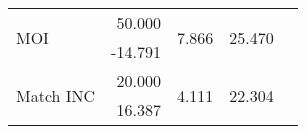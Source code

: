 \begin{table}[H]
{\begin{tabular}{|l|r|r|r|l}
\cline{1-4}
\multirow{2}{*}{MOI}                                                 & 50.000                                                                                                                                                                               & \multirow{2}{*}{7.866}                                                                                                                                                                            & \multirow{2}{*}{25.470}                                                                                                                                                                            & \multirow{2}{*}{}  \\
                                                                     & -14.791                                                                                                                                                                              &                                                                                                                                                                                                   &                                                                                                                                                                                                    &                    \\ 
\cline{1-4}
\multirow{2}{*}{Match INC}                                           & 20.000                                                                                                                                                                               & \multirow{2}{*}{4.111}                                                                                                                                                                            & \multirow{2}{*}{22.304}                                                                                                                                                                            & \multirow{2}{*}{}  \\
                                                                     & 16.387                                                                                                                                                                               &                                                                                                                                                                                                   &                                                                                                                                                                                                    &                    \\ 

\end{tabular}}
\end{table}
